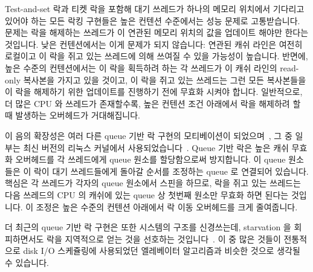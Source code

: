 \fi

Test-and-set 락과 티켓 락을 포함해 대기 쓰레드가 하나의 메모리 위치에서
기다리고 있어야 하는 모든 락킹 구현들은 높은 컨텐션 수준에서는 성능 문제로
고통받습니다.
문제는 락을 해제하는 쓰레드가 이 연관된 메모리 위치의 값을 업데이트 해야만
한다는 것입니다.
낮은 컨텐션에서는 이게 문제가 되지 않습니다: 연관된 캐쉬 라인은 여전히 로컬이고
이 락을 쥐고 있는 쓰레드에 의해 쓰여질 수 있을 가능성이 높습니다.
반면에, 높은 수준의 컨텐션에서는 이 락을 획득하려 하는 각 쓰레드가 이 캐쉬
라인의 read-only 복사본을 가지고 있을 것이고, 이 락을 쥐고 있는 쓰레드는 그런
모든 복사본들을 이 락을 해제하기 위한 업데이트를 진행하기 전에 무효화 시켜야
합니다.
일반적으로, 더 많은 CPU 와 쓰레드가 존재할수록, 높은 컨텐션 조건 아래에서 락을
해제하려 할 때 발생하는 오버헤드가 거대해집니다.

이 음의 확장성은 여러 다른 queue 기반 락 구현의 모티베이션이
되었으며~\cite{Anderson90,Graunke90,MellorCrummey91a,Wisniewski94,Craig93,Magnusson94,Takada93},
그 중 일부는 최신 버전의 리눅스 커널에서
사용되었습니다~\cite{JonathanCorbet2014qspinlocks}.
Queue 기반 락은 높은 캐쉬 무효화 오버헤드를 각 쓰레드에게 queue 원소를
할당함으로써 방지합니다.
이 queue 원소들은 이 락이 대기 쓰레드들에게 돌아갈 순서를 조정하는 queue 로
연결되어 있습니다.
핵심은 각 쓰레드가 각자의 queue 원소에서 스핀을 하므로, 락을 쥐고 있는 쓰레드는
다음 쓰레드의 CPU 의 캐쉬에 있는 queue 상 첫번째 원소만 무효화 하면 된다는
것입니다.
이 조정은 높은 수준의 컨텐션 아래에서 락 이동 오버헤드를 크게 줄여줍니다.

더 최근의 queue 기반 락 구현은 또한 시스템의 구조를 신경쓰는데, starvation 을
회피하면서도 락을 지역적으로 얻는 것을 선호하는
것입니다~\cite{McKenney02e,radovic03hierarchical,radovic02efficient,BenJackson02,McKenney02d}.
이 중 많은 것들이 전통적으로 disk I/O 스케쥴링에 사용되었던 엘레베이터
알고리즘과 비슷한 것으로 생각될 수 있습니다.

